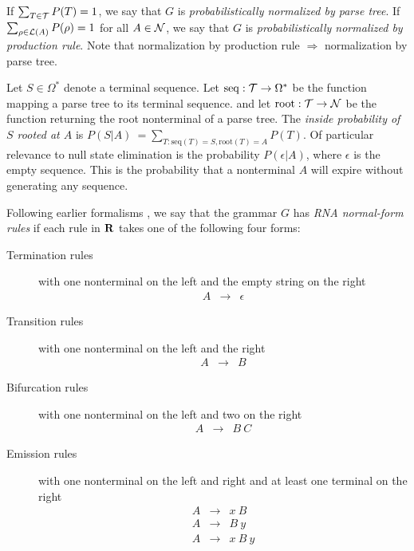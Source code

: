 \documentclass[10pt]{article}
\begin{document}
If $\sum_{T \in {\cal T}} P(T) = 1$, we say that $G$ is {\em probabilistically normalized by parse tree}.
If $\sum_{\rho \in {\cal L}(A)} P(\rho) = 1$ for all $A \in {\cal N}$, we say that $G$ is {\em probabilistically normalized by production rule}.
Note that normalization by production rule $\Rightarrow$ normalization by parse tree.

Let $S \in \Omega^\ast$ denote a terminal sequence.
Let $\mathrm{seq}:{\cal T} \to \Omega^\ast$ be the function mapping a parse tree to its terminal sequence.
and let $\mathrm{root}:{\cal T} \to {\cal N}$ be the function returning the root nonterminal of a parse tree.
The {\em inside probability of $S$ rooted at $A$} is $P(S|A)\ = \sum_{T: \mathrm{seq}(T) = S,\mathrm{root}(T) = A} P(T)$.
Of particular relevance to null state elimination is the probability $P(\epsilon|A)$,
where $\epsilon$ is the empty sequence.
This is the probability that a nonterminal $A$ will expire without generating any sequence.

Following earlier formalisms \cite{Durbin98,HolmesRubin2002a,Holmes2005},
we say that the grammar $G$ has {\em RNA normal-form rules} if
each rule in ${\bf R}$ takes one of the following four forms:

\noindent \hrulefill
\begin{description}
\item[Termination rules] with one nonterminal on the left and the empty string on the right
\begin{eqnarray*}
A & \to & \epsilon
\end{eqnarray*}
\item[Transition rules] with one nonterminal on the left and the right
\begin{eqnarray*}
A & \to & B
\end{eqnarray*}
\item[Bifurcation rules] with one nonterminal on the left and two on the right
\begin{eqnarray*}
A & \to & B\ C
\end{eqnarray*}
\item[Emission rules] with one nonterminal on the left and right and at least one terminal on the right
\begin{eqnarray*}
A & \to & x\ B \\
A & \to & B\ y \\
A & \to & x\ B\ y
\end{eqnarray*}
\end{description}
\noindent \hrulefill
\end{document}
